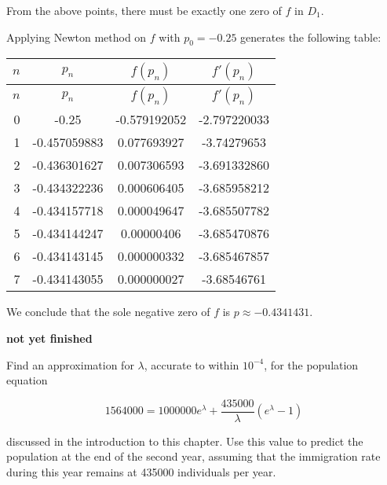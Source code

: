 \documentclass[../../../../Assignments]{subfiles}
\begin{document}
\begin{solution}
\begin{enumerate}[label = \alph*)]
            From the above points, there must be exactly one zero of \(f\) in
            \(D_1\).

            Applying Newton method on \(f\) with \(p_0 = \num{-0.25}\) generates
            the following table:

            \begin{longtable}{r S[table-format=-1.9] S[table-format=-1.9] S[table-format=-1.9]}
                \toprule
                \(n\)  &    {\(p_n\)}   &  {\(f(p_n)\)}  &  {\(f'(p_n)\)}  \\
                \midrule
                \endfirsthead
                \(n\)  &    {\(p_n\)}   &  {\(f(p_n)\)}  &  {\(f'(p_n)\)}  \\
                \midrule
                  &  -0.25         &  -0.579192052  &  -2.797220033   \\
                    1  &  -0.457059883  &   0.077693927  &  -3.74279653    \\
                    2  &  -0.436301627  &   0.007306593  &  -3.691332860   \\
                    3  &  -0.434322236  &   0.000606405  &  -3.685958212   \\
                    4  &  -0.434157718  &   0.000049647  &  -3.685507782   \\
                    5  &  -0.434144247  &   0.00000406   &  -3.685470876   \\
                    6  &  -0.434143145  &   0.000000332  &  -3.685467857   \\
                    7  &  -0.434143055  &   0.000000027  &  -3.68546761    \\
                \bottomrule
            \end{longtable}

            We conclude that the sole negative zero of \(f\) is \(p \approx
            \num{-0.4341431}\).
    \end{enumerate}

    \begin{center}
        \textbf{not yet finished}
    \end{center}
\end{solution}

\begin{exercise}
    Find an approximation for \(\lambda\), accurate to within \(10^{-4}\), for
    the population equation

    \[\num{1564000} = \num{1000000} e^\lambda + \frac{\num{435000}}{\lambda} (e^\lambda - 1)\]

    \noindent discussed in the introduction to this chapter. Use this value to
    predict the population at the end of the second year, assuming that the
    immigration rate during this year remains at \num{435000} individuals per
    year.
\end{exercise}
\end{document}
